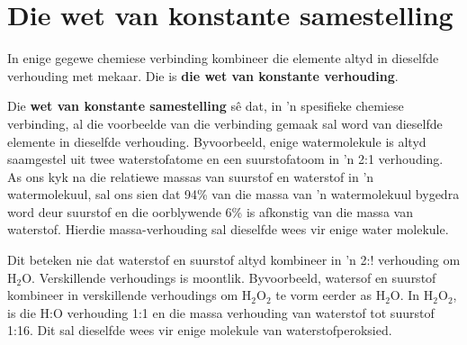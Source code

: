             \section{Die wet van konstante samestelling}
            \nopagebreak
      \label{m38711*id65065}In enige gegewe chemiese verbinding kombineer die elemente altyd in dieselfde verhouding met mekaar. Die is \textbf{die wet van konstante verhouding}.\par 
\label{m38711*id65075}Die \textbf{wet van konstante samestelling} s\^{e} dat, in 'n spesifieke chemiese verbinding, al die voorbeelde
van die verbinding gemaak sal word van dieselfde elemente in dieselfde verhouding. Byvoorbeeld, enige watermolekule is
altyd saamgestel uit twee waterstofatome en een suurstofatoom in 'n 2:1 verhouding. As ons kyk na die relatiewe massas van suurstof en waterstof in 'n watermolekuul, sal ons sien dat 94\% van die massa van 'n watermolekuul bygedra word deur suurstof en die oorblywende 6\% is afkonstig van die massa van waterstof. Hierdie massa-verhouding sal dieselfde wees vir enige water molekule.\par 
      \label{m38711*id65089}Dit beteken nie dat waterstof en suurstof altyd kombineer in 'n 2:! verhouding om $\text{H}{}_{2}\text{O}$. Verskillende verhoudings is moontlik. Byvoorbeeld, watersof en suurstof kombineer in verskillende verhoudings om $\text{H}{}_{2}\text{O}{}_{2}$ te vorm eerder as $\text{H}{}_{2}\text{O}$. In $\text{H}{}_{2}\text{O}{}_{2}$, is die H:O verhouding 1:1 en die massa verhouding van waterstof tot suurstof 1:16. Dit sal dieselfde wees vir enige molekule van waterstofperoksied.\par 

